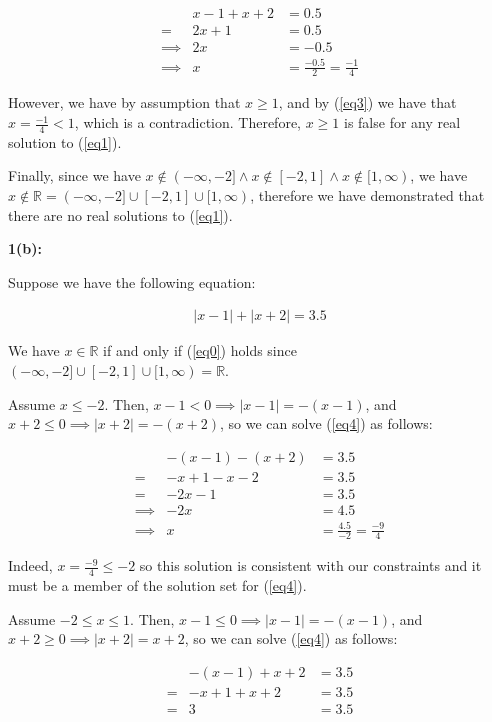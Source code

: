 \documentclass{article}
\newcommand{\reals}{\mathbb{R}}
\begin{document}
\begin{align}
	& x-1 +x+2 & = 0.5 \\
	= & 2x+1 & = 0.5 \\
	\implies & 2x & = -0.5 \\
	\label{eq3} \implies & x & = \frac{-0.5}{2} = \frac{-1}{4}
\end{align}

However, we have by assumption that $x \geq 1$,
and by (\ref{eq3}) we have that $x = \frac{-1}{4} < 1$,
which is a contradiction.
Therefore, $x \geq 1$ is false for any real solution to (\ref{eq1}).

Finally, since we have $x \not \in (-\infty,-2] \land x \not\in [-2,1] \land x \not \in [1,\infty)$,
we have $x \not \in \reals = (-\infty,-2] \cup [-2,1] \cup [1,\infty)$,
therefore we have demonstrated that there are no real solutions to (\ref{eq1}).

\medskip
\textbf{1(b):}

Suppose we have the following equation:

\begin{align} \label{eq4}
	|x-1| + |x+2| = 3.5
\end{align}

We have $x \in \reals $ if and only if (\ref{eq0}) holds
since $(-\infty,-2] \cup [-2,1] \cup [1,\infty) = \reals$.

Assume $x \le -2$.
Then, $x-1 < 0 \implies |x-1| = -(x-1)$,
and $x+2 \le 0 \implies |x+2| = -(x+2)$,
so we can solve (\ref{eq4}) as follows:

\begin{align}
	& -(x-1) -(x+2) & = 3.5 \\
	= & -x+1 -x-2 & = 3.5 \\
	= & -2x-1 & = 3.5 \\
	\implies & -2x & = 4.5 \\
	\label{eq5} \implies & x & = \frac{4.5}{-2} = \frac{-9}{4}
\end{align}

Indeed, $x = \frac{-9}{4} \le -2$ so this solution is consistent
with our constraints and it must be a member of the solution set for (\ref{eq4}).

Assume $-2 \le x \le 1$.
Then, $x-1 \le 0 \implies |x-1| = -(x-1)$,
and $x+2 \geq 0 \implies |x+2| = x+2$,
so we can solve (\ref{eq4}) as follows:

\begin{align}
	& -(x-1) + x+2 & = 3.5 \\
	= & -x+1 + x+2 & = 3.5 \\
	= & 3 & = 3.5
\end{align}
\end{document}
